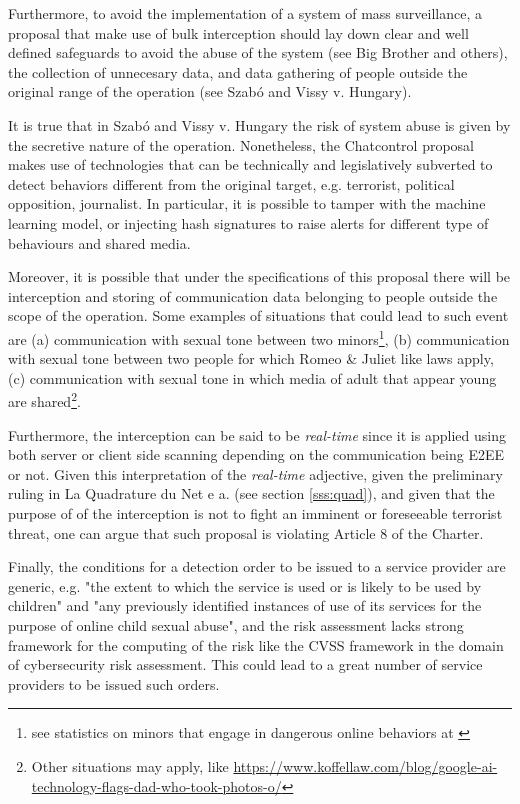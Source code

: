 Furthermore, to avoid the implementation of a system of mass surveillance, a proposal that make use of bulk interception should lay down clear and well defined safeguards to avoid the abuse of the system (see Big Brother and others), the collection of unnecesary data, and data gathering of people outside the original range of the operation (see Szabó and Vissy v. Hungary).

It is true that in Szabó and Vissy v. Hungary the risk of system abuse is given by the secretive nature of the operation. Nonetheless, the Chatcontrol proposal makes use of technologies that can be technically and legislatively subverted to detect behaviors different from the original target, e.g. terrorist, political opposition, journalist. In particular, it is possible to tamper with the machine learning model, or injecting hash signatures to raise alerts for different type of behaviours and shared media.

Moreover, it is possible that under the specifications of this proposal there will be interception and storing of communication data belonging to people outside the scope of the operation. Some examples of situations that could lead to such event are (a) communication with sexual tone between two minors\footnote{see statistics on minors that engage in dangerous online behaviors at \url{}}, (b) communication with sexual tone between two people for which Romeo \& Juliet like laws apply, (c) communication with sexual tone in which media of adult that appear young are shared\footnote{Other situations may apply, like \url{https://www.koffellaw.com/blog/google-ai-technology-flags-dad-who-took-photos-o/}}. 

Furthermore, the interception can be said to be \textit{real-time} since it is applied using both server or client side scanning depending on the communication being E2EE or not. Given this interpretation of the \textit{real-time} adjective, given the preliminary ruling in La Quadrature du Net e a. (see section \ref{sss:quad}), and given that the purpose of of the interception is not to fight an imminent or foreseeable terrorist threat, one can argue that such proposal is violating Article 8 of the Charter.

Finally, the conditions for a detection order to be issued to a service provider are generic, e.g. "the extent to which the service is used or is likely to be used by children" and "any previously identified instances of use of its services for the purpose of
online child sexual abuse"\cite{eu2023chatcontrol}, and the risk assessment lacks strong framework for the computing of the risk like the CVSS framework in the domain of cybersecurity risk assessment. This could lead to a great number of service providers to be issued such orders.

